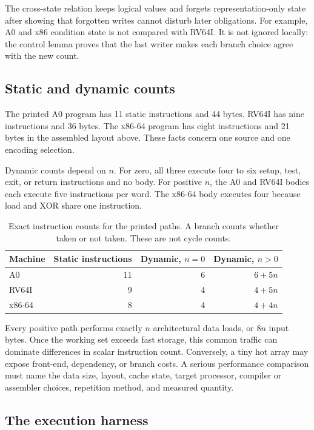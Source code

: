 The cross-state relation keeps logical values and forgets representation-only
state after showing that forgotten writes cannot disturb later obligations.
For example, A0 and x86 condition state is not compared with RV64I. It is not
ignored locally: the control lemma proves that the last writer makes each
branch choice agree with the new count.

\subsection{Static and dynamic counts}

The printed A0 program has 11 static instructions and 44 bytes. RV64I has nine
instructions and 36 bytes. The x86-64 program has eight instructions and 21
bytes in the assembled layout above. These facts concern one source and one
encoding selection.

Dynamic counts depend on \(n\). For zero, all three execute four to six setup,
test, exit, or return instructions and no body. For positive \(n\), the A0 and
RV64I bodies each execute five instructions per word. The x86-64 body executes
four because load and XOR share one instruction.

\begin{table}[htbp]
\centering
\caption{Exact instruction counts for the printed paths. A branch counts
whether taken or not taken. These are not cycle counts.}
\begin{tabular}{@{}lrrr@{}}
\toprule
Machine & Static instructions & Dynamic, \(n=0\) & Dynamic, \(n>0\) \\
\midrule
A0 & 11 & 6 & \(6+5n\) \\
RV64I & 9 & 4 & \(4+5n\) \\
x86-64 & 8 & 4 & \(4+4n\) \\
\bottomrule
\end{tabular}
\label{tab:xor-instruction-counts}
\end{table}

Every positive path performs exactly \(n\) architectural data loads, or
\(8n\) input bytes. Once the working set exceeds fast storage, this common
traffic can dominate differences in scalar instruction count. Conversely, a
tiny hot array may expose front-end, dependency, or branch costs. A serious
performance comparison must name the data size, layout, cache state, target
processor, compiler or assembler choices, repetition method, and measured
quantity.

\subsection{The execution harness}

